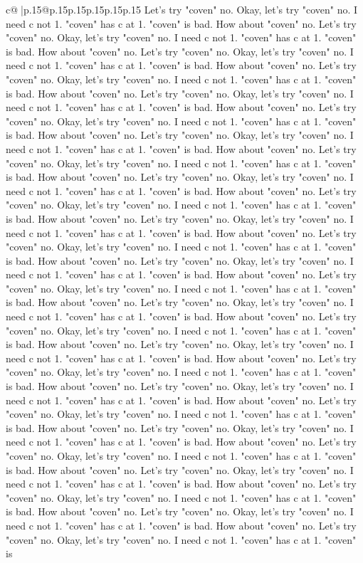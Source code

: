 \documentclass{article}
\begin{document}
{\begin{supertabular}{c@{$\;$}|p{.15\linewidth}@{}p{.15\linewidth}p{.15\linewidth}p{.15\linewidth}p{.15\linewidth}p{.15\linewidth}}
{{{Let's try "coven" no. Okay, let's try "coven" no. I need c not 1. "coven" has c at 1. "coven" is bad. How about "coven" no. Let's try "coven" no. Okay, let's try "coven" no. I need c not 1. "coven" has c at 1. "coven" is bad. How about "coven" no. Let's try "coven" no. Okay, let's try "coven" no. I need c not 1. "coven" has c at 1. "coven" is bad. How about "coven" no. Let's try "coven" no. Okay, let's try "coven" no. I need c not 1. "coven" has c at 1. "coven" is bad. How about "coven" no. Let's try "coven" no. Okay, let's try "coven" no. I need c not 1. "coven" has c at 1. "coven" is bad. How about "coven" no. Let's try "coven" no. Okay, let's try "coven" no. I need c not 1. "coven" has c at 1. "coven" is bad. How about "coven" no. Let's try "coven" no. Okay, let's try "coven" no. I need c not 1. "coven" has c at 1. "coven" is bad. How about "coven" no. Let's try "coven" no. Okay, let's try "coven" no. I need c not 1. "coven" has c at 1. "coven" is bad. How about "coven" no. Let's try "coven" no. Okay, let's try "coven" no. I need c not 1. "coven" has c at 1. "coven" is bad. How about "coven" no. Let's try "coven" no. Okay, let's try "coven" no. I need c not 1. "coven" has c at 1. "coven" is bad. How about "coven" no. Let's try "coven" no. Okay, let's try "coven" no. I need c not 1. "coven" has c at 1. "coven" is bad. How about "coven" no. Let's try "coven" no. Okay, let's try "coven" no. I need c not 1. "coven" has c at 1. "coven" is bad. How about "coven" no. Let's try "coven" no. Okay, let's try "coven" no. I need c not 1. "coven" has c at 1. "coven" is bad. How about "coven" no. Let's try "coven" no. Okay, let's try "coven" no. I need c not 1. "coven" has c at 1. "coven" is bad. How about "coven" no. Let's try "coven" no. Okay, let's try "coven" no. I need c not 1. "coven" has c at 1. "coven" is bad. How about "coven" no. Let's try "coven" no. Okay, let's try "coven" no. I need c not 1. "coven" has c at 1. "coven" is bad. How about "coven" no. Let's try "coven" no. Okay, let's try "coven" no. I need c not 1. "coven" has c at 1. "coven" is bad. How about "coven" no. Let's try "coven" no. Okay, let's try "coven" no. I need c not 1. "coven" has c at 1. "coven" is bad. How about "coven" no. Let's try "coven" no. Okay, let's try "coven" no. I need c not 1. "coven" has c at 1. "coven" is bad. How about "coven" no. Let's try "coven" no. Okay, let's try "coven" no. I need c not 1. "coven" has c at 1. "coven" is bad. How about "coven" no. Let's try "coven" no. Okay, let's try "coven" no. I need c not 1. "coven" has c at 1. "coven" is bad. How about "coven" no. Let's try "coven" no. Okay, let's try "coven" no. I need c not 1. "coven" has c at 1. "coven" is bad. How about "coven" no. Let's try "coven" no. Okay, let's try "coven" no. I need c not 1. "coven" has c at 1. "coven" is bad. How about "coven" no. Let's try "coven" no. Okay, let's try "coven" no. I need c not 1. "coven" has c at 1. "coven" is bad. How about "coven" no. Let's try "coven" no. Okay, let's try "coven" no. I need c not 1. "coven" has c at 1. "coven" is bad. How about "coven" no. Let's try "coven" no. Okay, let's try "coven" no. I need c not 1. "coven" has c at 1. "coven" is }}}
\end{supertabular}}
\end{document}
